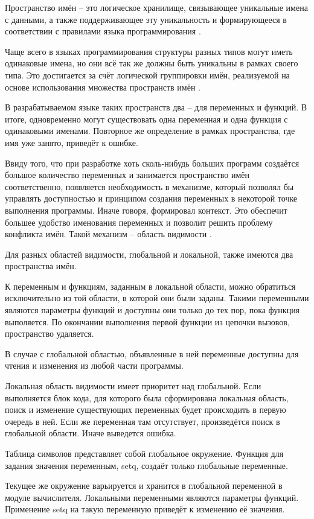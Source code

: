 Пространство имён -- это логическое хранилище, связывающее уникальные имена с данными, а также поддерживающее эту уникальность и формирующееся в соответствии с правилами языка программирования \cite{e18}.

Чаще всего в языках программирования структуры разных типов могут иметь одинаковые имена, но они всё так же должны быть уникальны в рамках своего типа. Это достигается за счёт логической группировки имён, реализуемой на основе использования множества пространств имён \cite{e22}.

В разрабатываемом языке таких пространств два -- для переменных и функций. В итоге, одновременно могут существовать одна переменная и одна функция с одинаковыми именами. Повторное же определение в рамках пространства, где имя уже занято, приведёт к ошибке. 

Ввиду того, что при разработке хоть сколь-нибудь больших программ создаётся большое количество переменных и занимается пространство имён соответственно, появляется необходимость в механизме, который позволял бы управлять доступностью и принципом создания переменных в некоторой точке выполнения программы. Иначе говоря, формировал контекст. Это обеспечит большее удобство именования переменных и позволит решить проблему конфликта имён. Такой механизм -- область видимости \cite{e18}.

Для разных областей видимости, глобальной и локальной, также имеются два пространства имён.

К переменным и функциям, заданным в локальной области, можно обратиться исключительно из той области, в которой они были заданы. Такими переменными являются параметры функций и доступны они только до тех пор, пока функция выполяется. По окончании выполнения первой функции из цепочки вызовов, пространство удаляется.

В случае с глобальной областью, объявленные в ней переменные доступны для чтения и изменения из любой части программы.

Локальная область видимости имеет приоритет над глобальной. Если выполняется блок кода, для которого была сформирована локальная область, поиск и изменение существующих переменных будет происходить в первую очередь в ней. Если же переменная там отсутствует, произведётся поиск в глобальной области. Иначе выведется ошибка.

Таблица символов представляет собой глобальное окружение. Функция для задания значения переменным, setq, создаёт только глобальные переменные.

Текущее же окружение варьируется и хранится в глобальной переменной в модуле вычислителя. Локальными переменными являются параметры функций. Применение setq на такую переменную приведёт к изменению её значения.